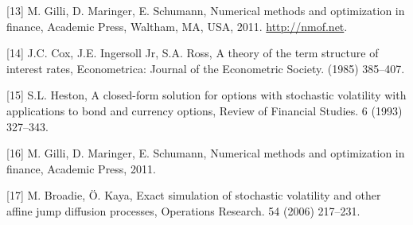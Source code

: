 \documentclass[12pt,twoside]{reedthesis}
\theoremstyle{definition}
\theoremstyle{definition}
\theoremstyle{remark}
\begin{document}
  \hypertarget{ref-nmof}{}
  {[}13{]} M. Gilli, D. Maringer, E. Schumann, Numerical methods and
  optimization in finance, Academic Press, Waltham, MA, USA, 2011.
  \url{http://nmof.net}.
  
  \hypertarget{ref-cox1985theory}{}
  {[}14{]} J.C. Cox, J.E. Ingersoll Jr, S.A. Ross, A theory of the term
  structure of interest rates, Econometrica: Journal of the Econometric
  Society. (1985) 385--407.
  
  \hypertarget{ref-heston1993closed}{}
  {[}15{]} S.L. Heston, A closed-form solution for options with stochastic
  volatility with applications to bond and currency options, Review of
  Financial Studies. 6 (1993) 327--343.
  
  \hypertarget{ref-gilli_numerical_2011}{}
  {[}16{]} M. Gilli, D. Maringer, E. Schumann, Numerical methods and
  optimization in finance, Academic Press, 2011.
  
  \hypertarget{ref-broadie2006exact}{}
  {[}17{]} M. Broadie, Ö. Kaya, Exact simulation of stochastic volatility
  and other affine jump diffusion processes, Operations Research. 54
  (2006) 217--231.


\end{document}
